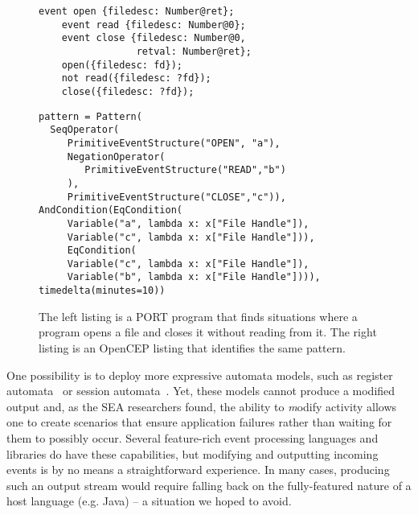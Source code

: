 \begin{figure}[t]
\centering
\begin{minipage}{.5\textwidth}
  \begin{lstlisting}[basicstyle=\ttfamily\small,gobble=4,xleftmargin=.8em]
    event open {filedesc: Number@ret};
    event read {filedesc: Number@0};
    event close {filedesc: Number@0,
                 retval: Number@ret};
    open({filedesc: fd});
    not read({filedesc: ?fd});
    close({filedesc: ?fd});
  \end{lstlisting}
  \end{minipage}%
  \begin{minipage}{.5\textwidth}
  \begin{lstlisting}[basicstyle=\ttfamily\tiny]
pattern = Pattern(
  SeqOperator(
     PrimitiveEventStructure("OPEN", "a"),
     NegationOperator(
        PrimitiveEventStructure("READ","b")
     ),
     PrimitiveEventStructure("CLOSE","c")),
AndCondition(EqCondition(
     Variable("a", lambda x: x["File Handle"]),
     Variable("c", lambda x: x["File Handle"])),
     EqCondition(
     Variable("c", lambda x: x["File Handle"]),
     Variable("b", lambda x: x["File Handle"]))),
timedelta(minutes=10))
  \end{lstlisting}
  \end{minipage}
  \caption{
  The left listing is a PORT program that finds situations
  where a program opens a file and closes it without reading from it.
  The right listing is an OpenCEP listing that identifies the same pattern.
}
  \label{fig:CompareListing}
\end{figure}



One possibility is to deploy more expressive automata models, such as register automata~\cite{DBLP:journals/tcs/KaminskiF94} or session automata~\cite{DBLP:journals/corr/BolligHLM14}. Yet, these models cannot produce a modified output and, as the 
SEA researchers found,  the ability to
{\textit modify} activity allows one to create scenarios that ensure
application failures rather than  waiting for them to possibly occur.
Several feature-rich event processing
languages and libraries do have these capabilities, but
modifying and outputting
incoming events
is by no means a straightforward experience.
In many cases, producing such an output stream  would require
falling back on the fully-featured nature of a host language (e.g. Java) -- a situation
we hoped to avoid.

